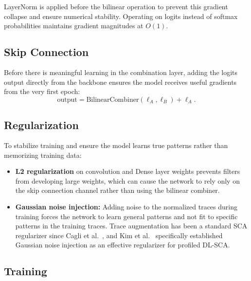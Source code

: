 \documentclass[runningheads]{llncs}
\begin{document}
LayerNorm is applied before the bilinear operation to prevent this gradient collapse and ensure numerical stability.
Operating on logits instead of softmax probabilities maintains gradient magnitudes at $O(1)$.

\subsection{Skip Connection}\label{sec:skip}

Before there is meaningful learning in the combination layer, adding the logits output directly from the backbone ensures the model receives useful gradients from the very first epoch:
\begin{equation}\label{eq:skip}
  \text{output} = \text{BilinearCombiner}(\bm{\ell}_A, \bm{\ell}_B) + \bm{\ell}_A.
\end{equation}

\subsection{Regularization}\label{sec:regularization}

To stabilize training and ensure the model learns true patterns rather than memorizing training data:

\begin{itemize}[leftmargin=*]
  \item \textbf{L2 regularization} on convolution and Dense layer weights prevents filters from developing large weights, which can cause the network to rely only on the skip connection channel rather than using the bilinear combiner.

  \item \textbf{Gaussian noise injection:} Adding noise to the normalized traces during training forces the network to learn general patterns and not fit to specific patterns in the training traces.
  Trace augmentation has been a standard SCA regularizer since Cagli et al.~\cite{cagli2017convolutional}, and Kim et al.~\cite{kim2019makenoise} specifically established Gaussian noise injection as an effective regularizer for profiled DL-SCA.
\end{itemize}

\subsection{Training}
\end{document}
